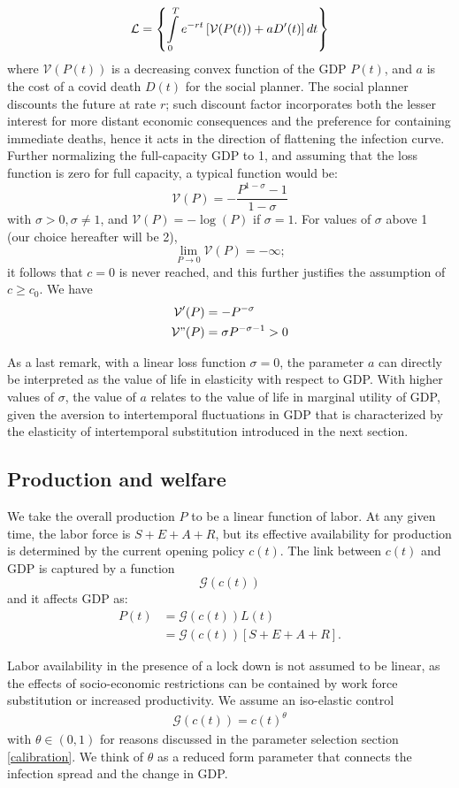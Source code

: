 \documentclass{amsart}
\begin{document}
\[
\mathcal{L}=\left\{ \intop_0^Te^{-rt}\left[\mathcal{V}(P(t))+aD'(t)\right]dt\right\} 
\]
where  $\mathcal{V}(P(t))$
is a decreasing convex function of the GDP $P(t)$, and $a$ is the cost
of a covid death $D(t)$ for the social planner. 
The social planner discounts the future at rate $r$; 
such discount factor incorporates both the lesser interest for more distant economic consequences and the preference for containing immediate deaths,
hence it acts in the direction of
flattening the infection curve. Further normalizing the full-capacity GDP to 1, and 
assuming that the loss function is zero 
for full capacity, a typical function
would be:
\[
\mathcal{V}(P)=-\frac{P^{1-\sigma}-1}{1-\sigma}
\]
with $\sigma>0, \sigma\neq 1$, and $\mathcal{V}(P)=-\log(P)$
if $\sigma=1$. For values of $\sigma$ above 1 (our choice hereafter will be 2),  
\[
\lim_{P\rightarrow0}\mathcal{V}(P)=-\infty;
\]
 it follows that  $c=0$ is  never reached,
 and this further justifies the assumption of 
 $c\geq c_0$.
We have 
\begin{align*}
\mathcal{V}'(P) & =-P^{-\sigma} \\
\mathcal{V}"(P) & =\sigma P^{-\sigma-1}>0
\end{align*}

As a last remark, with a linear loss function $\sigma=0$, the parameter $a$ can directly be interpreted as the value of life in elasticity with respect to GDP. With higher values of $\sigma$, the value of $a$ relates to the value of life in marginal utility of GDP, given the aversion to intertemporal fluctuations in GDP that is characterized by  the elasticity of intertemporal substitution introduced in the next section.

\subsection{Production and welfare }

We take the overall production $P$ to be a linear function
of labor. At any given time, the  labor force  is $S+E+A+R$,
but its effective availability for production is
determined by the current opening policy  $c(t)$.
The link between  $c(t)$ and GDP is captured by
a function
\[
\mathcal{G}(c(t))
\]
and it affects GDP as:
\begin{align} \label{production}
P(t) & =\mathcal{G}(c(t))L(t)\\
 & =\mathcal{G}(c(t))\left[S+E+A+R\right].
\end{align}

 Labor availability
in the presence of a lock down is not assumed to be linear, as
the effects of socio-economic restrictions can be contained by 
work force substitution or increased productivity. We assume an iso-elastic control
\begin{align}
    \mathcal{G}(c(t))=c(t)^{\theta}
\end{align}
with $\theta\in (0,1)$ for reasons discussed in the parameter selection  section \ref{calibration}. We think of $\theta$ as a reduced form parameter that connects the infection spread and the change in GDP.
\end{document}
